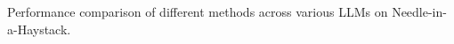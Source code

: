 

% 
\begin{table}[t]
\centering
\small
\scriptsize %

\caption{Performance comparison of different methods across various LLMs on Needle-in-a-Haystack.}
\renewcommand{\arraystretch}{0.9}  

\label{table:needle}


\end{table}
